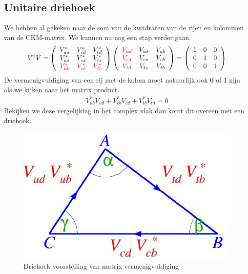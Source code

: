 \documentclass[../main.tex]{subfiles}
\begin{document}
\subsection{Unitaire driehoek}%
\label{sub:unitaire_driehoek}

We hebben al gekeken naar de som van de kwadraten van de rijen en kolommen van de CKM-matrix. We kunnen nu nog een stap verder gaan.
\begin{equation}
    \begin{aligned}
        \label{eq:unitaire_driehoek}
        V^{\dagger} V=\left(\begin{array}{ccc}
                V_{u d}^{*} & V_{c d}^{*} & V_{t d}^{*} \\
                V_{u s}^{*} & V_{c s}^{*} & V_{t s}^{*} \\
                {\color{red} V_{u b}^{*}} & {\color{red} V_{c b}^{*}} & {\color{red} V_{t b}^{*}}
                \end{array}\right)\left(\begin{array}{ccc}
                {\color{red} V_{u d}} & V_{u s} & V_{u b} \\
                {\color{red} V_{c d}} & V_{c s} & V_{c b} \\
                {\color{red} V_{t d}} & V_{t s} & V_{t b}
                \end{array}\right)=\left(\begin{array}{ccc}
                1 & 0 & 0 \\
                0 & 1 & 0 \\
                {\color{red} 0} & 0 & 1
        \end{array}\right)
    \end{aligned}
\end{equation}
De vermenigvuldiging van een rij met de kolom moet natuurlijk ook 0 of 1 zijn als we kijken naar het matrix product.
\begin{equation}
    \begin{aligned}
        \label{eq:matrix_vermenigvuldiging}
        V_{u b}^{*} V_{u d}+V_{c b}^{*} V_{c d}+V_{t b}^{*} V_{t d}=0
    \end{aligned}
\end{equation}
Bekijken we deze vergelijking in het complex vlak dan komt dit overeen met een driehoek.

\begin{figure}[h]
    \centering
    \includegraphics[width=0.6\linewidth]{cp_violation/complexe_driehoek.png}
    \caption{Driehoek voorstelling van matrix vermenigvuldiging}%
    \label{fig:cp_violation/complexe_driehoek}
\end{figure}
\end{document}
